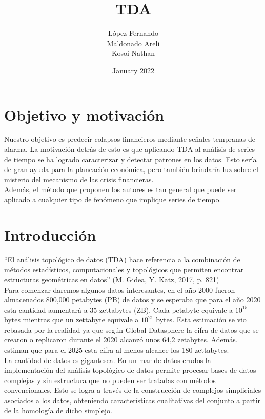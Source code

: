 \documentclass{article}
\title{TDA}
\author{López Fernando\\ Maldonado Areli\\ Kosoi Nathan }
\date{January 2022}
\begin{document}
\maketitle

\section{Objetivo y motivación}

Nuestro objetivo es predecir colapsos financieros mediante señales tempranas de alarma. La motivación detrás de esto es que aplicando TDA al análisis de series de tiempo se ha logrado caracterizar y detectar patrones en los datos. Esto sería de gran ayuda para la planeación económica, pero también brindaría luz sobre el misterio del mecanismo de las crisis financieras.\\

Además, el método que proponen los autores es tan general que puede ser aplicado a cualquier tipo de fenómeno que implique series de tiempo.


\maketitle

\section{Introducción}

“El análisis topológico de datos (TDA) hace referencia a la combinación de métodos estadísticos, computacionales y topológicos que permiten encontrar estructuras geométricas en datos” (M. Gidea, Y. Katz, 2017, p. 821)\\

Para comenzar daremos algunos datos interesantes, en el año 2000 fueron almacenados 800,000 petabytes (PB) de datos y se esperaba que para el año 2020 esta cantidad aumentará a 35 zettabytes (ZB). Cada petabyte equivale a $10^{15}$ bytes mientras que un zettabyte equivale a $10^{21}$ bytes. Esta estimación se vio rebasada por la realidad ya que según Global Datasphere la cifra de datos que se crearon o replicaron durante el 2020  alcanzó unos 64,2 zetabytes. Además, estiman que para el 2025 esta cifra al menos alcance los 180 zettabytes.\\

La cantidad de datos es gigantesca. En un mar de datos crudos la implementación del análisis topológico de datos permite procesar bases de datos complejas y sin estructura que no pueden ser tratadas con métodos convencionales. Esto se logra a través de la construcción de complejos simpliciales asociados a los datos, obteniendo características cualitativas del conjunto a partir de la homología de dicho simplejo. 
\end{document}
